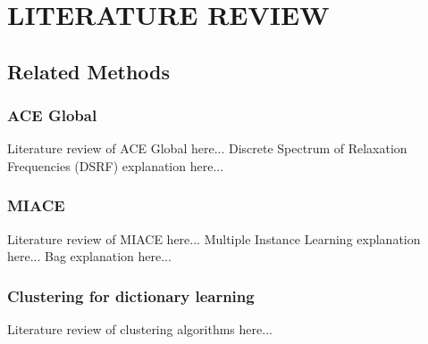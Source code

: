 \chapter{LITERATURE REVIEW} \label{lit}

\section{Related Methods}

\subsection{ACE Global}
Literature review of ACE Global here...\newline
Discrete Spectrum of Relaxation Frequencies (DSRF) explanation here...

\subsection{MIACE}
Literature review of MIACE here...\newline
Multiple Instance Learning explanation here...\newline
Bag explanation here...

\subsection{Clustering for dictionary learning}
Literature review of clustering algorithms here...


